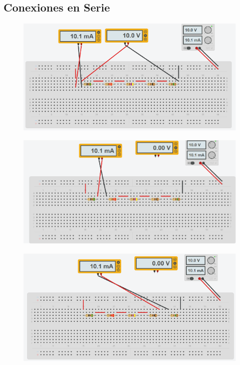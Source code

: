 \subsection{Conexiones en Serie}
\begin{figure}[H]
    \centering
    \begin{minipage}{0.45\textwidth}
      \centering
      \includegraphics[width=\textwidth]{Figures/1. Content/simulation/serie.png}
      \label{fig: Simulacion Conexion Serie}
    \end{minipage}
    \hfill
    \begin{minipage}{0.45\textwidth}
      \centering
      \includegraphics[width=\textwidth]{Figures/1. Content/simulation/serieA1.png}
      \label{fig: Simulacion Conexion Serie A1}
    \end{minipage}
    \hfill
    \begin{minipage}{0.45\textwidth}
      \centering
      \includegraphics[width=\textwidth]{Figures/1. Content/simulation/serieA2.png}

\end{minipage}
\end{figure}
